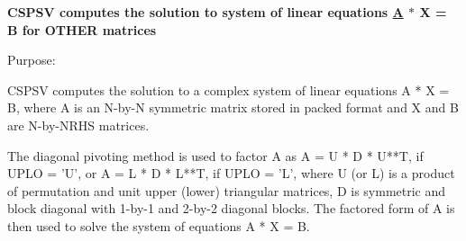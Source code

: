 {\bfseries  C\+S\+P\+S\+V computes the solution to system of linear equations \hyperlink{classA}{A} $\ast$ X = B for O\+T\+H\+E\+R matrices} 

 \begin{DoxyParagraph}{Purpose\+: }
\begin{DoxyVerb} CSPSV computes the solution to a complex system of linear equations
    A * X = B,
 where A is an N-by-N symmetric matrix stored in packed format and X
 and B are N-by-NRHS matrices.

 The diagonal pivoting method is used to factor A as
    A = U * D * U**T,  if UPLO = 'U', or
    A = L * D * L**T,  if UPLO = 'L',
 where U (or L) is a product of permutation and unit upper (lower)
 triangular matrices, D is symmetric and block diagonal with 1-by-1
 and 2-by-2 diagonal blocks.  The factored form of A is then used to
 solve the system of equations A * X = B.\end{DoxyVerb}
 
\end{DoxyParagraph}

